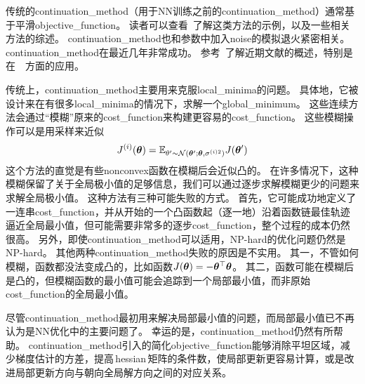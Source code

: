 传统的\gls{continuation_method}（用于\gls{NN}训练之前的\gls{continuation_method}）通常基于平滑\gls{objective_function}。
读者可以查看~\cite{Wu-97}了解这类方法的示例，以及一些相关方法的综述。
\gls{continuation_method}也和参数中加入\gls{noise}的模拟退火紧密相关\citep{Kirkpatrick83}。
\gls{continuation_method}在最近几年非常成功。
参考~\cite{Mobahi+Fisher-AAAI2015}了解近期文献的概述，特别是在~~方面的应用。


传统上，\gls{continuation_method}主要用来克服\gls{local_minima}的问题。
具体地，它被设计来在有很多\gls{local_minima}的情况下，求解一个\gls{global_minimum}。
这些连续方法会通过``模糊''原来的\gls{cost_function}来构建更容易的\gls{cost_function}。
这些模糊操作可以是用采样来近似
\begin{equation}
    J^{(i)}(\boldsymbol{\theta}) = \mathbb{E}_{\theta' \sim \mathcal{N}(\boldsymbol{\theta}'; \boldsymbol{\theta}, \sigma^{(i)2})} J(\boldsymbol{\theta}')
\end{equation}
这个方法的直觉是有些\gls{nonconvex}函数在模糊后会近似凸的。
在许多情况下，这种模糊保留了关于全局极小值的足够信息，我们可以通过逐步求解模糊更少的问题来求解全局极小值。
这种方法有三种可能失败的方式。
首先，它可能成功地定义了一连串\gls{cost_function}，并从开始的一个凸函数起（逐一地）沿着函数链最佳轨迹逼近全局最小值，但可能需要非常多的逐步\gls{cost_function}，整个过程的成本仍然很高。
另外，即使\gls{continuation_method}可以适用，NP-hard的优化问题仍然是NP-hard。
其他两种\gls{continuation_method}失败的原因是不实用。
其一，不管如何模糊，函数都没法变成凸的，比如函数$J(\boldsymbol{\theta}) = -\boldsymbol{\theta}^\top \boldsymbol{\theta}$。
其二，函数可能在模糊后是凸的，但模糊函数的最小值可能会追踪到一个局部最小值，而非原始\gls{cost_function}的全局最小值。


尽管\gls{continuation_method}最初用来解决局部最小值的问题，而局部最小值已不再认为是\gls{NN}优化中的主要问题了。
幸运的是，\gls{continuation_method}仍然有所帮助。
\gls{continuation_method}引入的简化\gls{objective_function}能够消除平坦区域，减少梯度估计的方差，提高\,\gls{hessian}\,矩阵的条件数，使局部更新更容易计算，或是改进局部更新方向与朝向全局解方向之间的对应关系。

